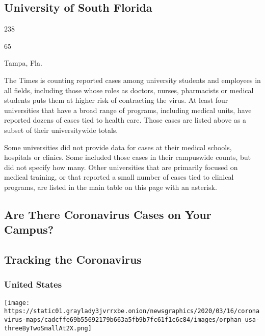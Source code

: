 \hypertarget{university-of-south-florida}{%
\subsection{University of South
Florida}\label{university-of-south-florida}}

238

65

Tampa, Fla.

The Times is counting reported cases among university students and
employees in all fields, including those whose roles as doctors, nurses,
pharmacists or medical students puts them at higher risk of contracting
the virus. At least four universities that have a broad range of
programs, including medical units, have reported dozens of cases tied to
health care. Those cases are listed above as a subset of their
universitywide totals.

Some universities did not provide data for cases at their medical
schools, hospitals or clinics. Some included those cases in their
campuswide counts, but did not specify how many. Other universities that
are primarily focused on medical training, or that reported a small
number of cases tied to clinical programs, are listed in the main table
on this page with an asterisk.

\hypertarget{are-there-coronavirus-cases-on-your-campus}{%
\subsection{Are There Coronavirus Cases on Your
Campus?}\label{are-there-coronavirus-cases-on-your-campus}}

\hypertarget{tracking-the-coronavirus}{%
\subsection{Tracking the Coronavirus}\label{tracking-the-coronavirus}}

\hypertarget{united-states}{%
\subsubsection{United States}\label{united-states}}

\href{https://www.nytimes3xbfgragh.onion/interactive/2020/us/coronavirus-us-cases.html}{}

\texttt{[image: https://static01.graylady3jvrrxbe.onion/newsgraphics/2020/03/16/coronavirus-maps/cadcffe69b55692179b663a5fb9b7fc61f1c6c84/images/orphan\_usa-threeByTwoSmallAt2X.png]}

